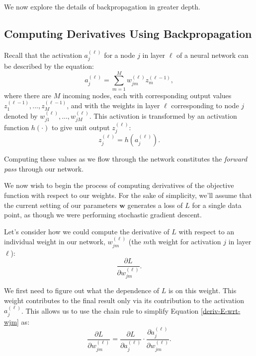 We now explore the details of backpropagation in greater depth.

\subsection{Computing Derivatives Using Backpropagation}

Recall that the activation $a_{j}^{(\ell)}$ for a  node $j$ in layer $\ell$ of a neural network can be described by the equation:
\begin{equation} \label{activations-reminder}
	a_{j}^{(\ell)} = \sum_{m=1}^{M} w^{(\ell)}_{jm} z^{(\ell-1)}_{m},
      \end{equation}
where there are $M$ incoming nodes, each with corresponding output values $z^{(\ell-1)}_{1}, ..., z^{(\ell-1)}_{M}$, and with the weights in layer $\ell$ corresponding to node $j$ denoted by $w^{(\ell)}_{j1}, ..., w^{(\ell)}_{jM}$.
This activation is transformed by an activation function $h(\cdot)$  to give unit output $z^{(\ell)}_{j}$:
\begin{equation} \label{transformed-activations-reminder}
	z^{(\ell)}_{j} = h(a^{(\ell)}_{j}).
\end{equation}

Computing these values as we flow through the network constitutes the {\em forward pass } through our network.

We now wish to begin the process of computing derivatives of the objective function with respect to our weights. For the sake of simplicity, we'll assume that the current setting of our parameters $\textbf{w}$ generates a loss of $L$ for a single data point, as though we were performing stochastic gradient descent.

Let's consider how we could compute the derivative of $L$ with respect to an individual weight in our network, $w^{(\ell)}_{jm}$ (the $m$th weight for activation $j$ in layer $\ell$):
%
\begin{equation} \label{deriv-E-wrt-wjm}
	\frac{\partial L}{\partial w^{(\ell)}_{jm}}.
\end{equation}

We first need to figure out what the dependence of $L$ is on this weight. This weight contributes to the final result only via its contribution to the activation $a^{(\ell)}_{j}$. This allows us to use the chain rule to simplify Equation \ref{deriv-E-wrt-wjm} as:
%
\begin{equation} \label{chain-rule-deriv-E-wrt-wjm}
	\frac{\partial L}{\partial w^{(\ell)}_{jm}} = \frac{\partial L}{\partial a^{(\ell)}_{j}} \cdot \frac{\partial a^{(\ell)}_{j}}{\partial w^{(\ell)}_{jm}}.
      \end{equation}

